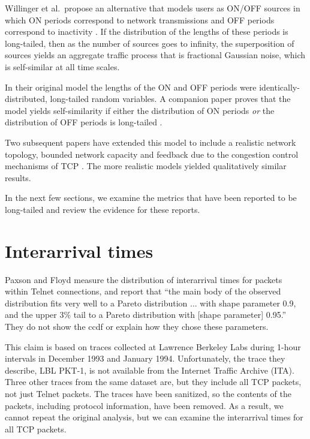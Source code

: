 \documentclass{elsart}
\begin{document}
Willinger et al.~propose an alternative that models
users as ON/OFF sources in which ON periods correspond to network
transmissions and OFF periods correspond to inactivity
\cite{WillingerTaqquShermanWilson95}.  If the distribution of the
lengths of these periods is long-tailed, then as the number of sources
goes to infinity, the superposition of sources yields an aggregate
traffic process that is fractional Gaussian noise, which is
self-similar at all time scales.

In their original model the lengths of the ON and OFF periods were
identically-distributed, long-tailed random variables.  A companion
paper proves that the model yields self-similarity if either the
distribution of ON periods {\em or} the distribution of OFF periods is
long-tailed \cite{TaqquWillingerSherman97}.

Two subsequent papers have extended this model to include a realistic
network topology, bounded network capacity and feedback due to the
congestion control mechanisms of TCP \cite{ParkKimCrovella96}
\cite{FeldmannGilbertHuangWillinger99}.  The more
realistic models yielded qualitatively similar results.

In the next few sections, we examine the metrics that have been reported
to be long-tailed and review the evidence for these reports.


\section{Interarrival times}
\label{interarrival}

Paxson and Floyd \cite{PaxsonFloyd95}
measure the distribution of interarrival times for packets
within Telnet connections, and report that ``the main body
of the observed distribution fits very well to a Pareto
distribution ... with shape parameter 0.9, and the upper 3\%
tail to a Pareto distribution with [shape parameter] 0.95.''
They do not show the ccdf or explain how they chose these parameters.

This claim is based on traces collected at Lawrence Berkeley Labs
during 1-hour intervals in December 1993 and January 1994.
Unfortunately, the trace they describe, LBL
PKT-1, is not available from the Internet Traffic Archive (ITA).
Three other traces from the same dataset are, but they include all
TCP packets, not just Telnet packets.  The traces have been
sanitized, so the contents of the packets, including protocol
information, have been removed.
As a result, we cannot repeat the original analysis, but we can
examine the interarrival times for all TCP packets.
\end{document}
